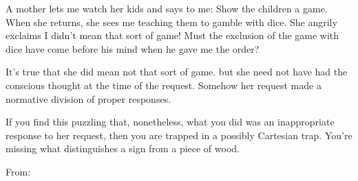 
A mother lets me watch her kids and says to me: Show the children a game. When she returns, she sees me teaching them to gamble with
dice. She angrily exclaims I didn't mean that sort of game! Must the exclusion
of the game with dice have come before his mind when he gave me the order?

It's true that she did mean not that sort of game. but she need not have had the conscious thought at the time of the request. Somehow her request made a normative division of proper responses.

If you find this puzzling that, nonetheless, what you did was an inappropriate response to her request, then you are trapped in a possibly Cartesian trap. You're missing what distinguishes a sign from a piece of wood.

From: \cite{wittgenstein2010philosophical}
